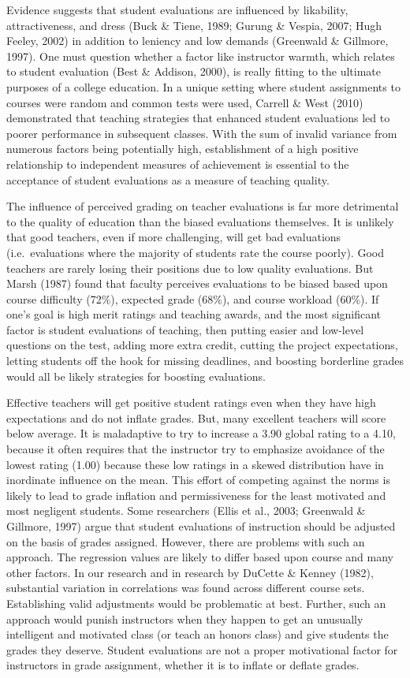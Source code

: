 \documentclass[man]{apa6}
\theoremstyle{definition}
\theoremstyle{definition}
\theoremstyle{definition}
\theoremstyle{remark}
\begin{document}
Evidence suggests that student evaluations are influenced by likability,
attractiveness, and dress (Buck \& Tiene, 1989; Gurung \& Vespia, 2007;
Hugh Feeley, 2002) in addition to leniency and low demands (Greenwald \&
Gillmore, 1997). One must question whether a factor like instructor
warmth, which relates to student evaluation (Best \& Addison, 2000), is
really fitting to the ultimate purposes of a college education. In a
unique setting where student assignments to courses were random and
common tests were used, Carrell \& West (2010) demonstrated that
teaching strategies that enhanced student evaluations led to poorer
performance in subsequent classes. With the sum of invalid variance from
numerous factors being potentially high, establishment of a high
positive relationship to independent measures of achievement is
essential to the acceptance of student evaluations as a measure of
teaching quality.

The influence of perceived grading on teacher evaluations is far more
detrimental to the quality of education than the biased evaluations
themselves. It is unlikely that good teachers, even if more challenging,
will get bad evaluations (i.e.~evaluations where the majority of
students rate the course poorly). Good teachers are rarely losing their
positions due to low quality evaluations. But Marsh (1987) found that
faculty perceives evaluations to be biased based upon course difficulty
(72\%), expected grade (68\%), and course workload (60\%). If one's goal
is high merit ratings and teaching awards, and the most significant
factor is student evaluations of teaching, then putting easier and
low-level questions on the test, adding more extra credit, cutting the
project expectations, letting students off the hook for missing
deadlines, and boosting borderline grades would all be likely strategies
for boosting evaluations.

Effective teachers will get positive student ratings even when they have
high expectations and do not inflate grades. But, many excellent
teachers will score below average. It is maladaptive to try to increase
a 3.90 global rating to a 4.10, because it often requires that the
instructor try to emphasize avoidance of the lowest rating (1.00)
because these low ratings in a skewed distribution have in inordinate
influence on the mean. This effort of competing against the norms is
likely to lead to grade inflation and permissiveness for the least
motivated and most negligent students. Some researchers (Ellis et al.,
2003; Greenwald \& Gillmore, 1997) argue that student evaluations of
instruction should be adjusted on the basis of grades assigned. However,
there are problems with such an approach. The regression values are
likely to differ based upon course and many other factors. In our
research and in research by DuCette \& Kenney (1982), substantial
variation in correlations was found across different course sets.
Establishing valid adjustments would be problematic at best. Further,
such an approach would punish instructors when they happen to get an
unusually intelligent and motivated class (or teach an honors class) and
give students the grades they deserve. Student evaluations are not a
proper motivational factor for instructors in grade assignment, whether
it is to inflate or deflate grades.
\end{document}
